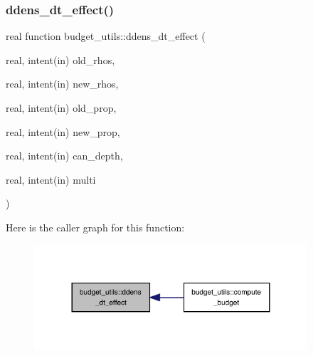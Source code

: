 \subsubsection{\texorpdfstring{ddens\+\_\+dt\+\_\+effect()}{ddens\_dt\_effect()}}
{\footnotesize\ttfamily real function budget\+\_\+utils\+::ddens\+\_\+dt\+\_\+effect (\begin{DoxyParamCaption}\item[{real, intent(in)}]{old\+\_\+rhos,  }\item[{real, intent(in)}]{new\+\_\+rhos,  }\item[{real, intent(in)}]{old\+\_\+prop,  }\item[{real, intent(in)}]{new\+\_\+prop,  }\item[{real, intent(in)}]{can\+\_\+depth,  }\item[{real, intent(in)}]{multi }\end{DoxyParamCaption})}

Here is the caller graph for this function\+:
\nopagebreak
\begin{figure}[H]
\begin{center}
\leavevmode
\includegraphics[width=288pt]{namespacebudget__utils_ae7ad8d90c28490b0b1c920e7a2656345_icgraph}
\end{center}
\end{figure}
\mbox{\label{namespacebudget__utils_ae3ca69dd43d1f92a0a86e21fcd57c641}} 
